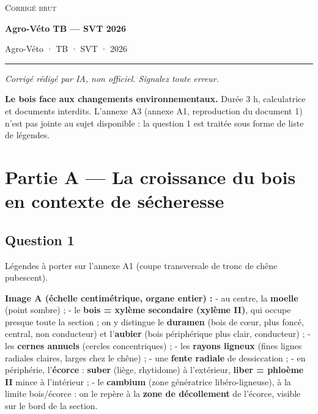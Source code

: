 \documentclass[11pt,a4paper]{article}
\begin{document}
\thispagestyle{plain}
\begin{center}
  {\small\scshape Corrigé brut}\par\smallskip
  {\LARGE\bfseries Agro-Véto TB — SVT 2026\par}\medskip
  {\large Agro-Véto · TB · SVT · 2026\par}
\end{center}
\vspace{2pt}\hrule\vspace{8pt}

\emph{Corrigé rédigé par IA, non officiel. Signalez toute erreur.}

\textbf{Le bois face aux changements environnementaux.} Durée 3 h, calculatrice et documents interdits. L'annexe A3 (annexe A1, reproduction du document 1) n'est pas jointe au sujet disponible : la question 1 est traitée sous forme de liste de légendes.

\hypertarget{partie-a-la-croissance-du-bois-en-contexte-de-suxe9cheresse}{%
\section{Partie A --- La croissance du bois en contexte de sécheresse}\label{partie-a-la-croissance-du-bois-en-contexte-de-suxe9cheresse}}

\hypertarget{question-1}{%
\subsection{Question 1}\label{question-1}}

Légendes à porter sur l'annexe A1 (coupe transversale de tronc de chêne pubescent).

\textbf{Image A (échelle centimétrique, organe entier) :}
- au centre, la \textbf{moelle} (point sombre) ;
- le \textbf{bois = xylème secondaire (xylème II)}, qui occupe presque toute la section ; on y distingue le \textbf{duramen} (bois de cœur, plus foncé, central, non conducteur) et l'\textbf{aubier} (bois périphérique plus clair, conducteur) ;
- les \textbf{cernes annuels} (cercles concentriques) ;
- les \textbf{rayons ligneux} (fines lignes radiales claires, larges chez le chêne) ;
- une \textbf{fente radiale} de dessiccation ;
- en périphérie, l'\textbf{écorce} : \textbf{suber} (liège, rhytidome) à l'extérieur, \textbf{liber = phloème II} mince à l'intérieur ;
- le \textbf{cambium} (zone génératrice libéro-ligneuse), à la limite bois/écorce : on le repère à la \textbf{zone de décollement} de l'écorce, visible sur le bord de la section.
\end{document}
